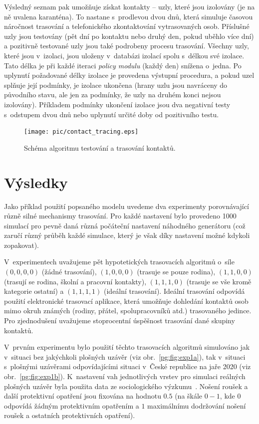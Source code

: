 Výsledný seznam pak umožňuje získat kontakty -- uzly, které jsou izolovány (je na
ně uvalena karanténa). To nastane s~prodlevou dvou dnů, která simuluje časovou
náročnost trasování a telefonického zkontaktování vytrasovaných osob.
Příslušné uzly jsou testovány (pět dní po kontaktu nebo druhý den, pokud uběhlo
více dní) a pozitivně testované uzly jsou také podrobeny procesu trasování. 
Všechny uzly, které jsou v~izolaci, jsou uloženy v~databázi izolací spolu s~délkou
své izolace. Tato délka je při každé iteraci {\em policy modulu} (každý den)
snížena o~jedna. Po uplynutí požadované délky izolace je provedena výstupní
procedura, a pokud uzel splňuje její podmínky, je izolace ukončena (hrany uzlu
jsou navráceny do původního stavu, ale jen za podmínky, že uzly na druhém konci
nejsou izolovány). Příkladem podmínky ukončení izolace jsou dva negativní testy
s~odstupem dvou dnů nebo uplynutí určité doby od pozitivního testu.


\begin{figure}[ht]
  \centering \texttt{[image: pic/contact\_tracing.eps]}
  \caption{Schéma algoritmu testování a trasování kontaktů.}
  \label{pg:fig:ct}
\end{figure}




\section*{Výsledky}
Jako příklad použití popsaného modelu uvedeme dva experimenty porovnávající
různě silné mechanismy trasování. Pro každé nastavení bylo provedeno 1000
simulací pro pevně daná různá počáteční nastavení náhodného
generátoru (což zaručí různý průběh každé simulace, který je však díky nastavení možné kdykoli zopakovat).

V~experimentech uvažujeme pět hypotetických trasovacích algoritmů
o~síle $(0, 0, 0, 0)$ (žádné trasování), $(1, 0, 0, 0)$ (trasuje se
pouze rodina), $(1, 1, 0, 0)$ (trasují se rodina, školní a pracovní
kontakty), $(1, 1, 1, 0)$ (trasuje se vše kromě kategorie ostatní) a
$(1, 1, 1, 1)$ (ideální trasování). Ideální trasování odpovídá použití
elektronické trasovací aplikace, která umožňuje dohledání kontaktů
osob mimo okruh známých (rodiny, přátel, spolupracovníků atd.) trasovaného jedince. Pro zjednodušení
uvažujeme stoprocentní úspěšnost trasování dané skupiny kontaktů.

V~prvním experimentu bylo použití těchto trasovacích algoritmů
simulováno jak v~situaci bez jakýchkoli plošných uzávěr (viz
obr.~\ref{pg:fig:exp1a}), tak v~situaci s~plošnými uzávěrami
odpovídajícími situaci v~České republice na jaře 2020 (viz
obr.~\ref{pg:fig:exp1b}). K~nastavení vah jednotlivých vrstev pro
simulaci reálných plošných uzávěr byla použita data ze sociologického
výzkumu~\cite{paqcovid}. Nošení roušek a další protektivní opatření
jsou fixována na hodnotu $0.5$ (na škále $0 - 1$, kde $0$ odpovídá
žádným protektivním opatřením a $1$ maximálnímu dodržování nošení
roušek a ostatních protektivních opatření).

